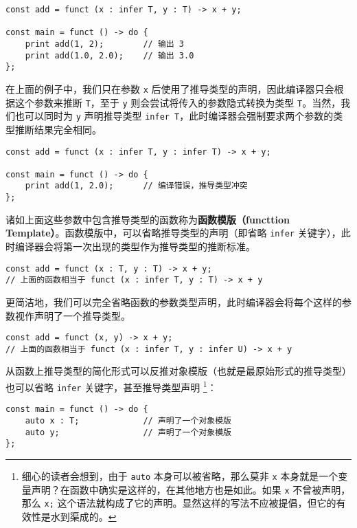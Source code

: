 \begin{lstlisting}
const add = funct (x : infer T, y : T) -> x + y;

const main = funct () -> do {
	print add(1, 2);		// 输出 3
	print add(1.0, 2.0);	// 输出 3.0
};
\end{lstlisting}

在上面的例子中，我们只在参数 \lstinline!x! 后使用了推导类型的声明，因此编译器只会根据这个参数来推断 \lstinline!T!，至于 \lstinline!y! 则会尝试将传入的参数隐式转换为类型 \lstinline!T!。当然，我们也可以同时为 \lstinline!y! 声明推导类型 \lstinline!infer T!，此时编译器会强制要求两个参数的类型推断结果完全相同。

\begin{lstlisting}
const add = funct (x : infer T, y : infer T) -> x + y;

const main = funct () -> do {
	print add(1, 2.0);		// 编译错误，推导类型冲突
};
\end{lstlisting}

诸如上面这些参数中包含推导类型的函数称为\textbf{函数模版（functtion Template）}。函数模版中，可以省略推导类型的声明（即省略 \lstinline!infer! 关键字），此时编译器会将第一次出现的类型作为推导类型的推断标准。

\begin{lstlisting}
const add = funct (x : T, y : T) -> x + y;
// 上面的函数相当于 funct (x : infer T, y : T) -> x + y
\end{lstlisting}

更简洁地，我们可以完全省略函数的参数类型声明，此时编译器会将每个这样的参数视作声明了一个推导类型。

\begin{lstlisting}
const add = funct (x, y) -> x + y;
// 上面的函数相当于 funct (x : infer T, y : infer U) -> x + y
\end{lstlisting}

从函数上推导类型的简化形式可以反推对象模版（也就是最原始形式的推导类型）也可以省略 \lstinline!infer! 关键字，甚至推导类型声明 \footnote{细心的读者会想到，由于 \lstinline!auto! 本身可以被省略，那么莫非 \lstinline!x! 本身就是一个变量声明？在函数中确实是这样的，在其他地方也是如此。如果 \lstinline!x! 不曾被声明，那么 \lstinline!x;! 这个语法就构成了它的声明。显然这样的写法不应被提倡，但它的有效性是水到渠成的。}：

\begin{lstlisting}
const main = funct () -> do {
	auto x : T;				// 声明了一个对象模版
	auto y;					// 声明了一个对象模版
};
\end{lstlisting}

